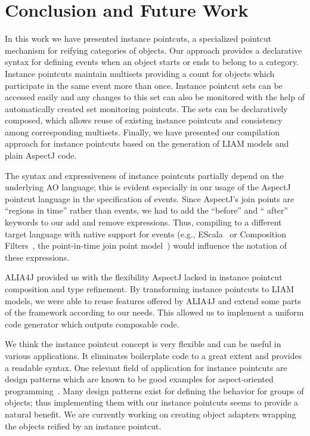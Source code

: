 \documentclass{acm_proc_article-sp}
\begin{document}
\section{Conclusion and Future Work}
In this work we have presented instance pointcuts, a specialized pointcut mechanism for reifying categories of objects. Our approach provides a declarative syntax for defining events when an object starts or ends to belong to a category. Instance pointcuts maintain multisets providing a count for objects which participate in the same event more than once. Instance pointcut sets can be accessed easily and any changes to this set can also be monitored with the help of automatically created set monitoring pointcuts. The sets can be declaratively composed, which allows reuse of existing instance pointcuts and consistency among corresponding multisets. Finally, we have presented our compilation approach for instance pointcuts based on the generation of LIAM models and plain AspectJ code.

The syntax and expressiveness of instance pointcuts partially depend on the underlying AO language; this is evident especially in our usage of the AspectJ pointcut language in the specification of events. Since AspectJ's join points are ``regions in time'' rather than events, we had to add the ``before'' and `` after'' keywords to our add and remove expressions. Thus, compiling to a different target language with native support for events (e.g., EScala~\cite{Gasiunas2011} or Composition Filters~\cite{Bergmans2001b}, the point-in-time join point model~\cite{masuharafine}) would influence the notation of these expressions.

ALIA4J provided us with the flexibility AspectJ lacked in instance pointcut composition and type refinement. By transforming instance pointcuts to LIAM models, we were able to reuse features offered by ALIA4J and extend some parts of the framework according to our needs. This allowed us to implement a uniform code generator which outputs composable code.


We think the instance pointcut concept is very flexible and can be useful in various applications. It eliminates boilerplate code to a great extent and provides a readable syntax. One relevant field of application for instance pointcuts are design patterns which are known to be good examples for aspect-oriented programming~\cite{hannemann:oopsla02}. Many design patterns exist for defining the behavior for groups of objects; thus implementing them with our instance pointcuts seems to provide a natural benefit. We are currently working on creating object adapters wrapping the objects reified by an instance pointcut.




\end{document}
